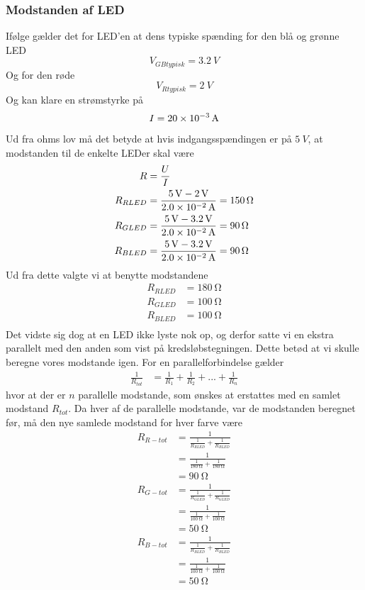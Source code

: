 \subsubsection{Modstanden af LED}
Ifølge \cite{kompLED} gælder det for LED'en at dens typiske spænding for den blå og grønne LED
\[
	V_{GB typisk} = \SI{3.2}{V}
\]
Og for den røde 
\[
	V_{R typisk} = \SI{2}{V}
\]
Og kan klare en strømstyrke på
\[
	I = \SI{20d-3}{A} 
\]
Ud fra ohms lov må det betyde at hvis indgangsspændingen er på $\SI{5}{V}$, at modstanden til de enkelte LEDer skal være
\begin{align}
	R&= \frac{U}{I}\\
	R_{RLED} &= \frac{\SI{5}{V}-\SI{2}{V}}{\SI{2.0d-2}{A}} = \SI{150}{\ohm}\\
	R_{GLED} &= \frac{\SI{5}{V}-\SI{3.2}{V}}{\SI{2.0d-2}{A}} = \SI{90}{\ohm}\\
	R_{BLED} &= \frac{\SI{5}{V}-\SI{3.2}{V}}{\SI{2.0d-2}{A}} = \SI{90}{\ohm}\\
\end{align}
Ud fra dette valgte vi at benytte modstandene 
\begin{align}
	R_{RLED} &= \SI{180}{\ohm}\\
	R_{GLED} &= \SI{100}{\ohm}\\
	R_{BLED} &= \SI{100}{\ohm}\\
\end{align}
Det vidste sig dog at en LED ikke lyste nok op, og derfor satte vi en ekstra parallelt med den anden som vist på kredsløbstegningen. Dette betød at vi skulle beregne vores modstande igen. For en parallelforbindelse gælder
\begin{align}
\frac{1}{R_{tot}}&=\frac{1}{R_1}+\frac{1}{R_2}+...+\frac{1}{R_n}
\end{align}
hvor at der er $n$ parallelle modstande, som ønskes at erstattes med en samlet modstand $R_{tot}$. Da hver af de parallelle modstande, var de modstanden beregnet før, må den nye samlede modstand for hver farve være
\begin{align}
R_{R-tot}&=\frac{1}{\frac{1}{R_{RLED}}+\frac{1}{R_{RLED}}}\\
&=\frac{1}{\frac{1}{\SI{180}{\ohm}}+\frac{1}{\SI{180}{\ohm}}}\\
&=\SI{90}{\ohm}\\
R_{G-tot}&=\frac{1}{\frac{1}{R_{GLED}}+\frac{1}{R_{GLED}}}\\
&=\frac{1}{\frac{1}{\SI{100}{\ohm}}+\frac{1}{\SI{100}{\ohm}}}\\
&=\SI{50}{\ohm}\\
R_{B-tot}&=\frac{1}{\frac{1}{R_{BLED}}+\frac{1}{R_{BLED}}}\\
&=\frac{1}{\frac{1}{\SI{100}{\ohm}}+\frac{1}{\SI{100}{\ohm}}}\\
&=\SI{50}{\ohm}
\end{align}
